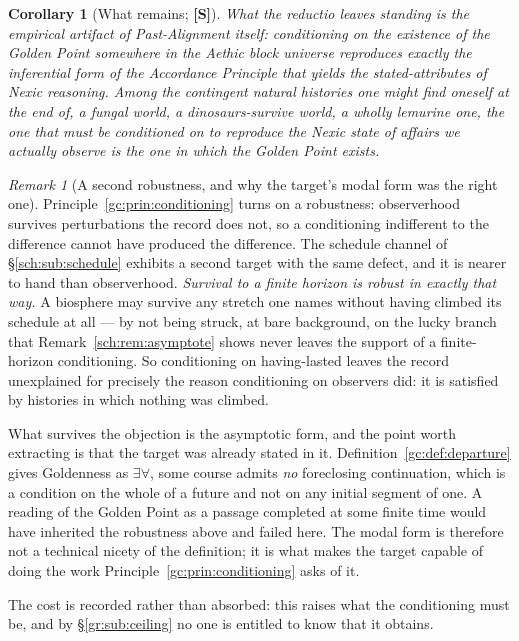 \documentclass[11pt]{article}
\numberwithin{equation}{section}
\theoremstyle{plain}
\newtheorem{corollary}[theorem]{Corollary}
\theoremstyle{definition}
\theoremstyle{remark}
\newtheorem{remark}[theorem]{Remark}
\begin{document}
\begin{corollary}[What remains; \textbf{[S]}]\label{gc:cor:remains}
What the reductio leaves standing is the empirical artifact of
Past-Alignment itself: conditioning on the existence of the Golden Point
somewhere in the Aethic block universe reproduces exactly the
inferential form of the Accordance Principle that yields the
stated-attributes of Nexic reasoning. Among the contingent natural
histories one might find oneself at the end of, a fungal world, a
dinosaurs-survive world, a wholly lemurine one, the one that must be
conditioned on to reproduce the Nexic state of affairs we actually
observe is the one in which the Golden Point exists.
\end{corollary}

\begin{remark}[A second robustness, and why the target's modal form was
the right one]\label{gc:rem:finitehorizon}
Principle~\ref{gc:prin:conditioning} turns on a robustness: observerhood
survives perturbations the record does not, so a conditioning
indifferent to the difference cannot have produced the difference. The
schedule channel of \S\ref{sch:sub:schedule} exhibits a second target
with the same defect, and it is nearer to hand than observerhood. \emph{Survival to a finite horizon is robust in exactly that way.} A
biosphere may survive any stretch one names without having climbed its
schedule at all --- by not being struck, at bare background, on the
lucky branch that Remark~\ref{sch:rem:asymptote} shows never leaves the
support of a finite-horizon conditioning. So conditioning on
having-lasted leaves the record unexplained for precisely the reason
conditioning on observers did: it is satisfied by histories in which
nothing was climbed.

What survives the objection is the asymptotic form, and the point worth
extracting is that the target was already stated in it.
Definition~\ref{gc:def:departure} gives Goldenness as $\exists\forall$, some course admits \emph{no} foreclosing continuation, which is a
condition on the whole of a future and not on any initial segment of
one. A reading of the Golden Point as a passage completed at some finite
time would have inherited the robustness above and failed here. The
modal form is therefore not a technical nicety of the definition; it is
what makes the target capable of doing the work
Principle~\ref{gc:prin:conditioning} asks of it.

The cost is recorded rather than absorbed: this raises what the
conditioning must be, and by \S\ref{gr:sub:ceiling} no one is entitled
to know that it obtains.
\end{remark}
\end{document}

